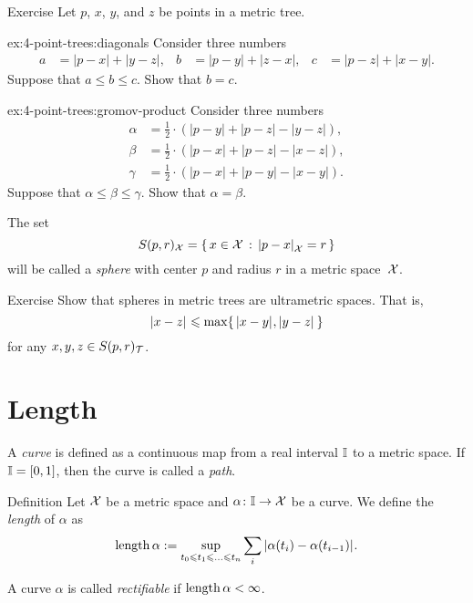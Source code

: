 \begin{thm}{Exercise}\label{ex:4-point-trees}
Let $p$, $x$, $y$, and $z$ be points in a metric tree.

\begin{subthm}{ex:4-point-trees:diagonals}
Consider three numbers 
\begin{align*}
a&=|p-x|+|y-z|,
&
b&=|p-y|+|z-x|,
&
c&=|p-z|+|x-y|.
\end{align*}
Suppose that $a\le b\le c$.
Show that $b=c$.
\end{subthm}

\begin{subthm}{ex:4-point-trees:gromov-product}
Consider three numbers 
\begin{align*}
\alpha&=\tfrac12\cdot(|p-y|+|p-z|-|y-z|),
\\
\beta &=\tfrac12\cdot(|p-x|+|p-z|-|x-z|),
\\
\gamma&=\tfrac12\cdot(|p-x|+|p-y|-|x-y|).
\end{align*}
Suppose that $\alpha\le \beta\le \gamma$.
Show that $\alpha=\beta$.
\end{subthm}

\end{thm}

The set 
\[S(p,r)_{\spc{X}}=\set{x\in\spc{X}}{\dist{p}{x}{\spc{X}}=r}\]
will be called a \emph{sphere} with center $p$ and radius $r$ in a metric space~$\mathcal{X}$.


\begin{thm}{Exercise}\label{ex:spheres-in-trees}
Show that spheres in metric trees are ultrametric spaces.
That is, 
\[\dist{x}{z}{}
\le
\max\{\,\dist{x}{y}{},\dist{y}{z}{}\,\}\]
for any $x,y,z\in S(p,r)_{\mathcal{T}}$.
\end{thm}

\section{Length}

A \emph{curve} is defined as a continuous map from a real interval $\mathbb{I}$ to a metric space.
If $\mathbb{I}=[0,1]$, then the curve is called a \emph{path}.

\begin{thm}{Definition}
Let $\mathcal{X}$ be a metric space and
$\alpha\colon \mathbb{I}\to \mathcal{X}$ be a curve.
We define the \emph{length} of $\alpha$ as 
\[
\length \alpha \df \sup_{t_0\le t_1\le\ldots\le t_n}\sum_i \dist{\alpha(t_i)}{\alpha(t_{i-1})}{}.
\]

A curve $\alpha$ is called \emph{rectifiable} if $\mathop{\rm length}\nolimits \alpha<\infty$.
\end{thm}



